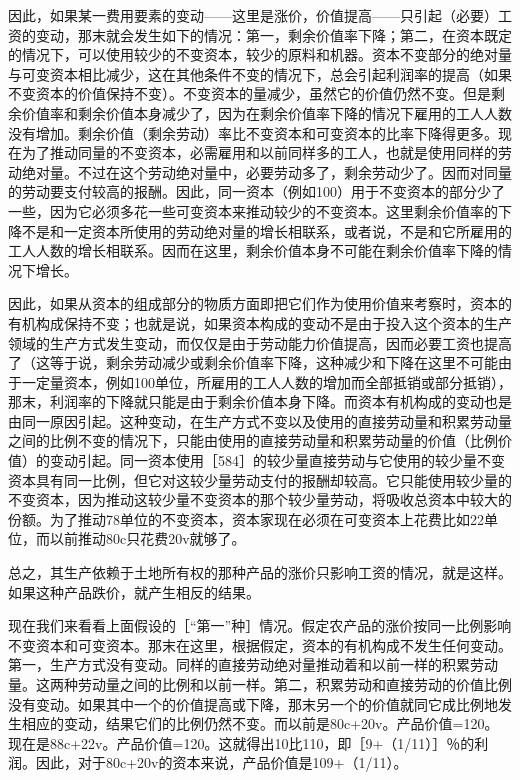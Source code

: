 因此，如果某一费用要素的变动——这里是涨价，价值提高——只引起（必要）工资的变动，那末就会发生如下的情况：第一，剩余价值率下降；第二，在资本既定的情况下，可以使用较少的不变资本，较少的原料和机器。资本不变部分的绝对量与可变资本相比减少，这在其他条件不变的情况下，总会引起利润率的提高（如果不变资本的价值保持不变）。不变资本的量减少，虽然它的价值仍然不变。但是剩余价值率和剩余价值本身减少了，因为在剩余价值率下降的情况下雇用的工人人数没有增加。剩余价值（剩余劳动）率比不变资本和可变资本的比率下降得更多。现在为了推动同量的不变资本，必需雇用和以前同样多的工人，也就是使用同样的劳动绝对量。不过在这个劳动绝对量中，必要劳动多了，剩余劳动少了。因而对同量的劳动要支付较高的报酬。因此，同一资本（例如100）用于不变资本的部分少了一些，因为它必须多花一些可变资本来推动较少的不变资本。这里剩余价值率的下降不是和一定资本所使用的劳动绝对量的增长相联系，或者说，不是和它所雇用的工人人数的增长相联系。因而在这里，剩余价值本身不可能在剩余价值率下降的情况下增长。

因此，如果从资本的组成部分的物质方面即把它们作为使用价值来考察时，资本的有机构成保持不变；也就是说，如果资本构成的变动不是由于投入这个资本的生产领域的生产方式发生变动，而仅仅是由于劳动能力价值提高，因而必要工资也提高了（这等于说，剩余劳动减少或剩余价值率下降，这种减少和下降在这里不可能由于一定量资本，例如100单位，所雇用的工人人数的增加而全部抵销或部分抵销），那末，利润率的下降就只能是由于剩余价值本身下降。而资本有机构成的变动也是由同一原因引起。这种变动，在生产方式不变以及使用的直接劳动量和积累劳动量之间的比例不变的情况下，只能由使用的直接劳动量和积累劳动量的价值（比例价值）的变动引起。同一资本使用［584］的较少量直接劳动与它使用的较少量不变资本具有同一比例，但它对这较少量劳动支付的报酬却较高。它只能使用较少量的不变资本，因为推动这较少量不变资本的那个较少量劳动，将吸收总资本中较大的份额。为了推动78单位的不变资本，资本家现在必须在可变资本上花费比如22单位，而以前推动80c只花费20v就够了。

总之，其生产依赖于土地所有权的那种产品的涨价只影响工资的情况，就是这样。如果这种产品跌价，就产生相反的结果。

现在我们来看看上面假设的［“第一”种］情况。假定农产品的涨价按同一比例影响不变资本和可变资本。那末在这里，根据假定，资本的有机构成不发生任何变动。第一，生产方式没有变动。同样的直接劳动绝对量推动着和以前一样的积累劳动量。这两种劳动量之间的比例和以前一样。第二，积累劳动和直接劳动的价值比例没有变动。如果其中一个的价值提高或下降，那末另一个的价值就同它成比例地发生相应的变动，结果它们的比例仍然不变。而以前是80c+20v。产品价值=120。现在是88c+22v。产品价值=120。这就得出10比110，即［9+（1/11）］％的利润。因此，对于80c+20v的资本来说，产品价值是109+（1/11）。

